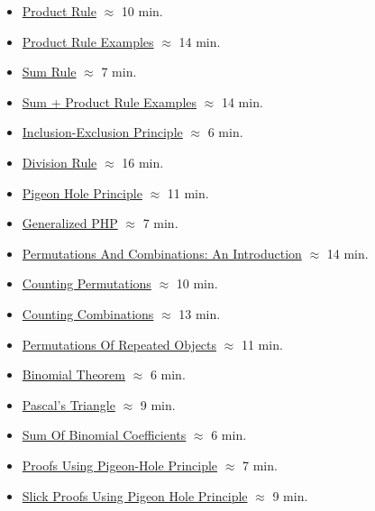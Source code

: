 \begin{itemize}
    \item \href{https://applied.cs.colorado.edu/mod/hvp/view.php?id=51784}{Product Rule} $\approx$ 10 min.
    \item \href{https://applied.cs.colorado.edu/mod/hvp/view.php?id=51785}{Product Rule Examples} $\approx$ 14 min.
    \item \href{https://applied.cs.colorado.edu/mod/hvp/view.php?id=51786}{Sum Rule} $\approx$ 7 min.
    \item \href{https://applied.cs.colorado.edu/mod/hvp/view.php?id=51787}{Sum + Product Rule Examples} $\approx$ 14 min.
    \item \href{https://applied.cs.colorado.edu/mod/hvp/view.php?id=51788}{Inclusion-Exclusion Principle} $\approx$ 6 min.
    \item \href{https://applied.cs.colorado.edu/mod/hvp/view.php?id=51789}{Division Rule} $\approx$ 16 min.
    \item \href{https://applied.cs.colorado.edu/mod/hvp/view.php?id=51791}{Pigeon Hole Principle} $\approx$ 11 min.
    \item \href{https://applied.cs.colorado.edu/mod/hvp/view.php?id=51792}{Generalized PHP} $\approx$ 7 min.
    \item \href{https://applied.cs.colorado.edu/mod/hvp/view.php?id=51794}{Permutations And Combinations: An Introduction} $\approx$ 14 min.
    \item \href{https://applied.cs.colorado.edu/mod/hvp/view.php?id=51795}{Counting Permutations} $\approx$ 10 min.
    \item \href{https://applied.cs.colorado.edu/mod/hvp/view.php?id=51796}{Counting Combinations} $\approx$ 13 min.
    \item \href{https://applied.cs.colorado.edu/mod/hvp/view.php?id=51797}{Permutations Of Repeated Objects} $\approx$ 11 min.
    \item \href{https://applied.cs.colorado.edu/mod/hvp/view.php?id=51799}{Binomial Theorem} $\approx$ 6 min.
    \item \href{https://applied.cs.colorado.edu/mod/hvp/view.php?id=51800}{Pascal's Triangle} $\approx$ 9 min.
    \item \href{https://applied.cs.colorado.edu/mod/hvp/view.php?id=51801}{Sum Of Binomial Coefficients} $\approx$ 6 min.
    \item \href{https://applied.cs.colorado.edu/mod/hvp/view.php?id=51803}{Proofs Using Pigeon-Hole Principle} $\approx$ 7 min.
    \item \href{https://applied.cs.colorado.edu/mod/hvp/view.php?id=51804}{Slick Proofs Using Pigeon Hole Principle} $\approx$ 9 min.

\end{itemize}
